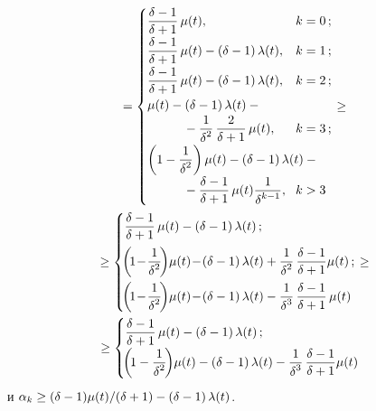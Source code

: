 \begin{multicols}{2}
    \noindent
    \begin{multline*}
    {}=
 \begin{cases}
          \displaystyle  \fr{\delta-1}{\delta+1}\,\mu(t), & \hspace*{-10mm}k= 0\,;\\
          \displaystyle  \fr{\delta-1}{\delta+1}\,\mu(t) - \left(\delta - 1\right) \lambda(t), & \hspace*{-10mm}k  = 1\,;\\
    \fr{\delta-1}{\delta+1}\,\mu(t) - \left(\delta - 1\right) \lambda(t), & \hspace*{-10mm}k  = 2\,;\\
          \displaystyle \mu(t) -\left(\delta - 1\right) \lambda(t) - {}&\\
          \hspace*{10mm}{}-\fr{1}{\delta^2}\,\fr{2}{\delta+1}\,\mu(t), & \hspace*{-10mm}k = 3\,;\\
    \left(1-\fr{1}{\delta^2}\right) \mu(t) -\left(\delta - 1\right) 
\lambda(t) - {}&\\
\hspace*{10mm}{}- \fr{\delta-1}{\delta+1}\,\mu(t) \fr{1}{\delta^{k-1}}, & \hspace*{-10mm}k > 3
 \end{cases} \ge{}
\\
  {}  \ge
    \begin{cases}
            \displaystyle   \fr{\delta-1}{\delta+1}\,\mu(t) - \left(\delta - 1\right) 
\lambda(t)\,; \\[9pt]
           \displaystyle    \!\left(\!1\!-\!\fr{1}{\delta^2}\!\right)\!\mu(t) \!-\!\left(\delta - 1\right) 
\lambda(t) + \fr{1}{\delta^2}\, \fr{\delta-1}{\delta+1}\mu(t)\,; \\[9pt]
          \displaystyle     \!\left(\!1\!-\!\fr{1}{\delta^2}\!\right)\! \mu(t) \!-\!\left(\delta - 1\right) 
\lambda(t) -  \fr{1}{\delta^{3}}\,\fr{\delta-1}{\delta+1}\,\mu(t)  
    \end{cases}  \!\!\!\!\!\! \ge{}\\
    {}\ge
\begin{cases}
       \displaystyle\fr{\delta-1}{\delta+1}\,\mu(t) - \left(\delta - 1\right) \lambda(t)\,; \\
       \displaystyle\!\left(\!1-\fr{1}{\delta^2}\!\right)\! \mu(t) -\left(\delta - 1\right) \lambda(t) -  
\fr{1}{\delta^{3}}\,\fr{\delta-1}{\delta+1}\mu(t)  
\end{cases}
\end{multline*}
 и $ \alpha_{k} \ge ({\delta-1})\mu(t)/({\delta+1})\hm - \left(\delta \hm- 1\right) 
\lambda(t) $.


\end{multicols}
